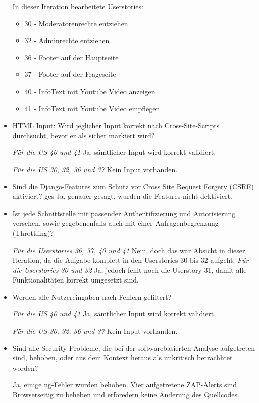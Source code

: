 \begin{itemize}

In dieser Iteration bearbeitete Userstories:
\begin{itemize}
\item 30 - Moderatorenrechte entziehen
\item 32 - Adminrechte entziehen
\item 36 - Footer auf der Hauptseite
\item 37 - Footer auf der Frageseite
\item 40 - InfoText mit Youtube Video anzeigen
\item 41 - InfoText mit Youtube Video einpflegen
\end{itemize}

\item HTML Input: Wird jeglicher Input korrekt nach Cross-Site-Scripts durchsucht, bevor er als sicher markiert wird?

\emph{Für die US 40 und 41}
Ja, sämtlicher Input wird korrekt validiert.

\emph{Für die US 30, 32, 36 und 37}
Kein Input vorhanden.


\item Sind die Django-Features zum Schutz vor Cross Site Request Forgery (CSRF) aktiviert?
ges
Ja, genauer gesagt, wurden die Features nicht dektiviert.


\item Ist jede Schnittstelle mit passender Authentifizierung und Autorisierung versehen, sowie gegebenenfalls auch mit einer Anfragenbegrenzung (Throttling)?

\emph{Für die Userstories 36, 37, 40 und 41}
Nein, doch das war Absicht in dieser Iteration, da die Aufgabe komplett in den Userstories 30 bis 32 aufgeht.
\emph{Für die Userstories 30 und 32}
Ja, jedoch fehlt noch die Userstory 31, damit alle Funktionalitäten korrekt umgesetzt sind.


\item Werden alle Nutzereingaben nach Fehlern gefiltert?

\emph{Für die US 40 und 41}
Ja, sämtlicher Input wird korrekt validiert.

\emph{Für die US 30, 32, 36 und 37}
Kein Input vorhanden.

\item Sind alle Security Probleme, die bei der softwarebasierten Analyse aufgetreten sind, behoben, oder aus dem Kontext heraus als unkritisch betrachhtet worden?

Ja, einige ng-Fehler wurden behoben. Vier aufgetretene ZAP-Alerts sind Browserseitig zu beheben und erforedern keine Änderung des Quellcodes.


\end{itemize}

